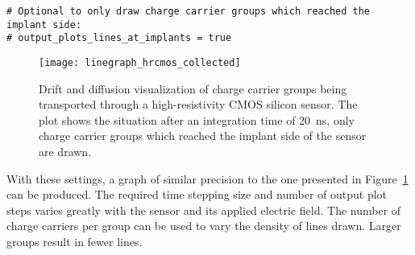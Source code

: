 \begin{description}
\begin{verbatim}
# Optional to only draw charge carrier groups which reached the implant side:
# output_plots_lines_at_implants = true
\end{verbatim}

\begin{figure}[tbp]
    \centering
  \texttt{[image: linegraph\_hrcmos\_collected]}
  \caption{Drift and diffusion visualization of charge carrier groups being transported through a high-resistivity CMOS silicon sensor. The plot shows the situation after an integration time of \SI{20}{\nano \second}, only charge carrier groups which reached the implant side of the sensor are drawn.}
  \label{fig:linegraph}
\end{figure}

With these settings, a graph of similar precision to the one presented in Figure~\ref{fig:linegraph} can be produced.
The required time stepping size and number of output plot steps varies greatly with the sensor and its applied electric field.
The number of charge carriers per group can be used to vary the density of lines drawn. Larger groups result in fewer lines.

\end{description}

